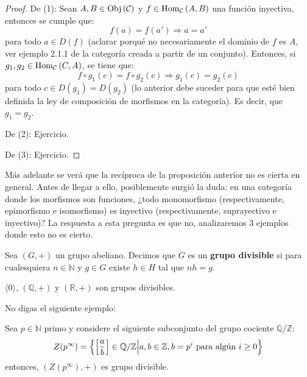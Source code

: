 \documentclass[12pt]{report}
\theoremstyle{largebreak}
\newcommand{\Obj}[1]{\ensuremath{\textup{Obj}\left(#1\right)}}
\newcommand{\Hom}[3]{\ensuremath{\textup{Hom}_{#1}\left(#2,#3\right)}}
\begin{document}
    \begin{proof}
        De (1): Sean $A,B\in\Obj{\mathcal{C}}$ y $f\in\Hom{\mathcal{C}}{A}{B}$ una función inyectiva, entonces se cumple que:
        \begin{equation*}
            f(a)=f(a')\Rightarrow a=a'
        \end{equation*}
        para todo $a\in D(f)$ (aclarar porqué no necesariamente el dominio de $f$ es $A$, ver ejemplo 2.1.1 de la categoría creada a partir de un conjunto). Entonces, si $g_1,g_2\in \Hom{\mathcal{C}}{C}{A}$, se tiene que:
        \begin{equation*}
            f\circ g_1(c)=f\circ g_2(c)\Rightarrow g_1(c)=g_2(c)
        \end{equation*}
        para todo $c\in D(g_1)=D(g_2)$ (lo anterior debe suceder para que esté bien definida la ley de composición de morfismos en la categoría). Es decir, que $g_1=g_2$.

        De (2): Ejercicio.

        De (3): Ejercicio.
    \end{proof}

    Más adelante se verá que la recíproca de la proposición anterior no es cierta en general. Antes de llegar a ello, posiblemente surgió la duda: en una categoría donde los morfismos son funciones, ¿todo monomorfismo (respectivamente, epimorfismo e isomorfismo) es inyectivo (respectivamente, suprayectivo e inyectivo)? La respuesta a esta pregunta es que no, analizaremos 3 ejemplos donde esto no es cierto. 

    \begin{mydef}
        Sea $(G,+)$ un grupo abeliano. Decimos que $G$ es un \textbf{grupo divisible} si para cualesquiera $n\in\mathbb{N}$ y $g\in G$ existe $h\in H$ tal que $nh=g$.
    \end{mydef}

    \begin{exa}
        $\langle 0\rangle$, $(\mathbb{Q},+)$ y $(\mathbb{R},+)$ son grupos divisibles.
    \end{exa}

    No digas el siguiente ejemplo:

    \begin{exa}
        Sea $p\in\mathbb{N}$ primo y considere el siguiente subconjunto del grupo cociente $\mathbb{Q}/\mathbb{Z}$:
        \begin{equation*}
            Z(p^\infty)=\left\{\left[\frac{a}{b} \right]\in\mathbb{Q}/\mathbb{Z} \Big|a,b\in\mathbb{Z},b=p^i\textup{ para algún }i\geq0 \right\}
        \end{equation*}
        entonces, $(Z(p^\infty),+)$ es grupo divisible.
    \end{exa}
    
\end{document}
